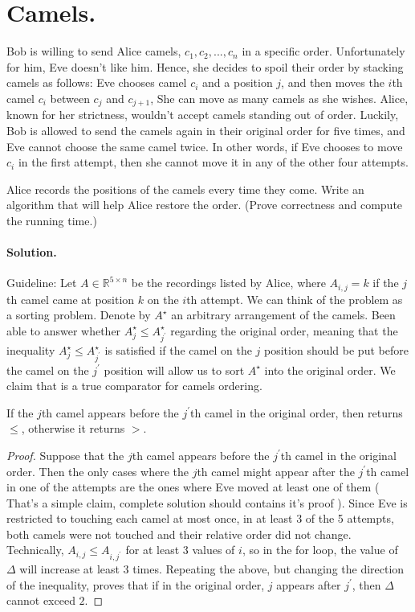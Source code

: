  \section{Camels.} 
 Bob is willing to send Alice camels, $c_1, c_2, ..., c_n$ in a specific order. Unfortunately for him, Eve doesn't like him. Hence, she decides to spoil their order by stacking camels as follows: Eve chooses camel $c_i$ and a position $j$, and then moves the $i$th camel $c_i$ between $c_j$ and $c_{j+1}$, She can move as many camels as she wishes. Alice, known for her strictness, wouldn't accept camels standing out of order. Luckily, Bob is allowed to send the camels again in their original order for five times, and Eve cannot choose the same camel twice. In other words, if Eve chooses to move $c_i$ in the first attempt, then she cannot move it in any of the other four attempts.

Alice records the positions of the camels every time they come. Write an algorithm that will help Alice restore the order. (Prove correctness and compute the running time.)
\ifdefined\SOLUTION
  \paragraph{Solution.} Guideline: Let $A \in \mathbb{R}^{5 \times n}$ be the recordings listed by Alice, where $A_{i,j} = k$ if the $j$th camel came at position $k$ on the $i$th attempt.  We can think of the problem as a sorting problem. Denote by $A^{\star}$ an arbitrary arrangement of the camels. Been able to answer whether $A^{\star}_{j} \le A^{\star}_{j^{\prime}}$ regarding the original order, meaning that the inequality $A^{\star}_{j} \le A^{\star}_{j^{\prime}}$ is satisfied if the camel on the $j$ position should be put before the camel on the $j^{\prime}$ position will allow us to sort $A^{\star}$ into the original order. We claim that  is a true comparator for camels ordering. 

  \begin{claim} 
If the $j$th camel appears before the $j^{\prime}$th camel in the original order, then  returns $\leq$, otherwise it returns $>$.
  \end{claim}
  \begin{proof}
    Suppose that the $j$th camel appears before the $j^{\prime}$th camel in the original order. Then the only cases where the $j$th camel might appear after the $j^{\prime}$th camel in one of the attempts are the ones where Eve moved at least one of them ( That's a simple claim, complete solution should contains it's proof ). Since Eve is restricted to touching each camel at most once, in at least 3 of the 5 attempts, both camels were not touched and their relative order did not change. Technically, $A_{i,j} \le A_{i,j^{\prime}}$ for at least 3 values of $i$, so in the for loop, the value of $\Delta$ will increase at least 3 times. Repeating the above, but changing the direction of the inequality, proves that if in the original order, $j$ appears after $j^{\prime}$, then $\Delta$ cannot exceed $2$.
  \end{proof}

